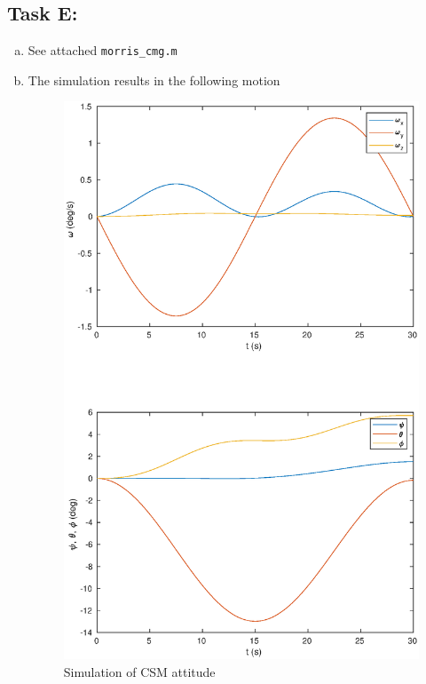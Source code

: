 \documentclass[a4paper]{article}
\begin{document}
\subsection*{Task E:}%
\begin{enumerate}[a.]
  \item See attached \texttt{morris\_cmg.m}
  \item The simulation results in the following motion
    \begin{figure}[H]
    \begin{center}
      \includegraphics[scale=0.7]{task_e_b.eps}
    \end{center}
    \caption{Simulation of CSM attitude}
    \end{figure}

\end{enumerate}
\end{document}
